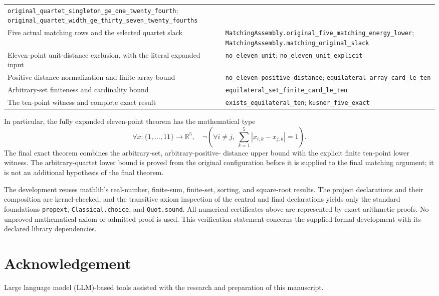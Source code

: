 \documentclass[11pt]{article}
\theoremstyle{definition}
\theoremstyle{remark}
\newcommand{\R}{\mathbb R}
\newcommand{\abs}[1]{\left|#1\right|}
\newcommand{\lean}[1]{\nolinkurl{#1}}
\begin{document}
\begin{longtable}{>{\raggedright\arraybackslash}p{}>{\raggedright\arraybackslash}p{}}
\lean{original_quartet_singleton_ge_one_twenty_fourth};
\lean{original_quartet_width_ge_thirty_seven_twenty_fourths}\\[3pt]
Five actual matching rows and the selected quartet slack &
\lean{MatchingAssembly.original_five_matching_energy_lower};
\lean{MatchingAssembly.matching_original_slack}\\[3pt]
Eleven-point unit-distance exclusion, with the literal expanded input &
\lean{no_eleven_unit}; \lean{no_eleven_unit_explicit}\\[3pt]
Positive-distance normalization and finite-array bound &
\lean{no_eleven_positive_distance};
\lean{equilateral_array_card_le_ten}\\[3pt]
Arbitrary-set finiteness and cardinality bound &
\lean{equilateral_set_finite_card_le_ten}\\[3pt]
The ten-point witness and complete exact result &
\lean{exists_equilateral_ten}; \lean{kusner_five_exact}\\
\end{longtable}
\endgroup

In particular, the fully expanded eleven-point theorem has the
mathematical type
\[
 \forall x:\{1,\ldots,11\}\to\R^5,\quad
 \neg\left(\forall i\ne j,\ \sum_{k=1}^5\abs{x_{i,k}-x_{j,k}}=1\right).
\]
The final exact theorem combines the arbitrary-set, arbitrary-positive-
distance upper bound with the explicit finite ten-point lower witness.
The arbitrary-quartet lower bound is proved from the original
configuration before it is supplied to the final matching argument;
it is not an additional hypothesis of the final theorem.

The development reuses mathlib's real-number, finite-sum, finite-set,
sorting, and square-root results. The project declarations and their
composition are kernel-checked, and the transitive axiom inspection of
the central and final declarations yields only the standard foundations
\lean{propext}, \lean{Classical.choice}, and \lean{Quot.sound}.
All numerical certificates above are represented by exact arithmetic
proofs. No unproved mathematical axiom or admitted proof is used.
This verification statement concerns the supplied formal development
with its declared library dependencies.

\section*{Acknowledgement}
Large language model (LLM)-based tools assisted with the research and preparation of this manuscript.



\end{document}

